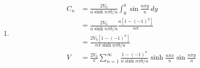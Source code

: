 \documentclass{article}
\begin{document}
\begin{enumerate}
  \item

        \begin{align*}
          C_n & = \frac{2 V_0}{a \sinh n \pi b / a} \int_0^a \sin \frac{n \pi y}{a} \,d y                                                     \\
              & = \frac{2 V_0}{a \sinh n \pi b / a} \frac{a [1 - (-1)^n]}{n \pi}                                                              \\
              & = \frac{2 V_0 [1 - (-1)^n]}{n \pi \sinh n \pi b / a}                                                                          \\
          V   & = \frac{2 V_0}{\pi} \sum_{n = 1}^\infty \frac{1 - (-1)^n}{n \sinh n \pi b / a} \sinh \frac{n \pi x}{a} \sin \frac{n \pi y}{a}
        \end{align*}
\end{enumerate}

\subsection{}
\end{document}
